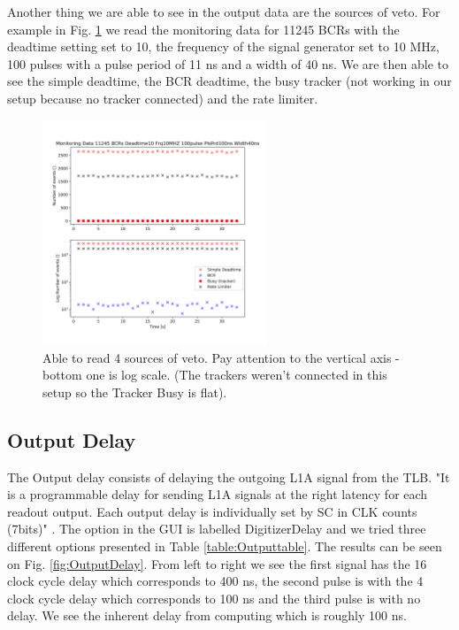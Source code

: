 Another thing we are able to see in the output data are the sources of veto. For example in Fig. \ref{fig:VetoSources} we read the monitoring data for 11245 BCRs with the deadtime setting set to 10, the frequency of the signal generator set to 10 MHz, 100 pulses with a pulse period of 11 ns and a width of 40 ns. We are then able to see the simple deadtime, the BCR deadtime, the busy tracker (not working in our setup because no tracker connected) and the rate limiter.

\begin{figure}[htbp!] 
\centering    
\includegraphics[width=0.6\textwidth]{MonitoringData11245HzDeadtime10Frq10MHZ100pulsePlsPrd100nsWidth40ns.png}
\caption[Veto sources]{Able to read 4 sources of veto. Pay attention to the vertical axis - bottom one is log scale. (The trackers weren't connected in this setup so the Tracker Busy is flat).}
\label{fig:VetoSources}
\end{figure}

\subsection{Output Delay}

The Output delay consists of delaying the outgoing L1A signal from the TLB. "It is a programmable delay for sending L1A signals at the right latency for each readout output. Each output delay is individually set by SC in CLK counts (7bits)" \cite{debieux_trigger_2019}. The option in the GUI is labelled DigitizerDelay and we tried three different options presented in Table \ref{table:Outputtable}. The results can be seen on Fig. \ref{fig:OutputDelay}. From left to right we see the first signal has the 16 clock cycle delay which corresponds to 400 ns, the second pulse is with the 4 clock cycle delay which corresponds to 100 ns and the third pulse is with no delay. We see the inherent delay from computing which is roughly 100 ns.

